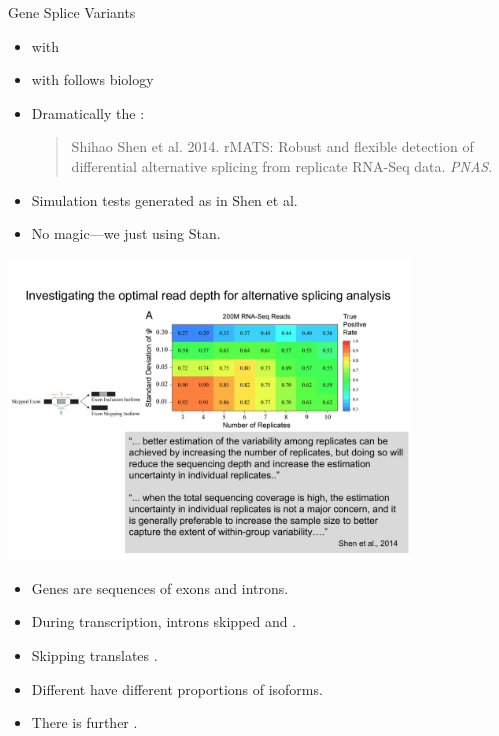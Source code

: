 \documentclass[10pt]{report}
\begin{document}
       {Gene Splice Variants}

\begin{itemize}
\item {} with
\item {} with  follows biology
\item Dramatically  the :
\begin{quote}
\footnotesize Shihao Shen et al. 2014. rMATS: Robust and flexible detection of
differential alternative splicing from replicate RNA-Seq data.
{\slshape PNAS}.
\end{quote}
\item Simulation tests generated as in Shen et al.
\item No magic---we just  using Stan.
\end{itemize}

\begin{center}
\includegraphics[width=0.8\textwidth]{img/cassette-exon.pdf}
\end{center}
\begin{itemize}
\item Genes are sequences of exons and introns.
\item During transcription, introns skipped and .
\item Skipping  translates .
\item Different  have different proportions of isoforms.
\item There is further .
\end{itemize}
\end{document}
